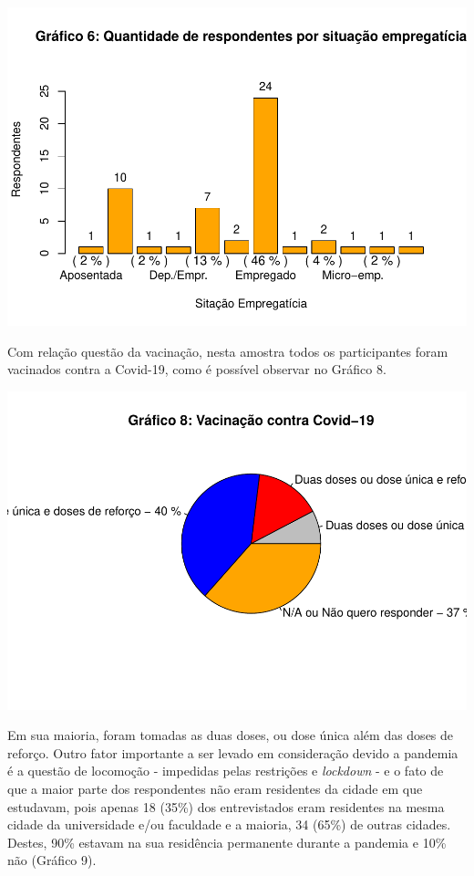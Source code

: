 \documentclass[
]{article}
\begin{document}
\includegraphics{consequencias-oriundas-da-pandemia-v1.0_files/figure-latex/grafico-6-1.pdf}

Com relação questão da vacinação, nesta amostra todos os participantes
foram vacinados contra a Covid-19, como é possível observar no Gráfico
8.

\includegraphics{consequencias-oriundas-da-pandemia-v1.0_files/figure-latex/grafico-8-1.pdf}

Em sua maioria, foram tomadas as duas doses, ou dose única além das
doses de reforço. Outro fator importante a ser levado em consideração
devido a pandemia é a questão de locomoção - impedidas pelas restrições
e \emph{lockdown} - e o fato de que a maior parte dos respondentes não
eram residentes da cidade em que estudavam, pois apenas 18 (35\%) dos
entrevistados eram residentes na mesma cidade da universidade e/ou
faculdade e a maioria, 34 (65\%) de outras cidades. Destes, 90\% estavam
na sua residência permanente durante a pandemia e 10\% não (Gráfico 9).
\end{document}
